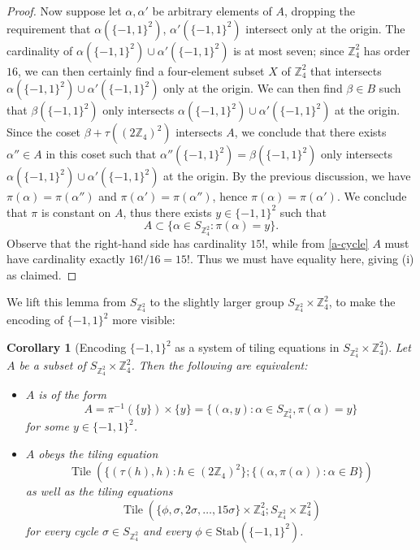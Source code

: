 \documentclass[reqno,a4paper,12pt]{amsart}
\numberwithin{equation}{section}
\numberwithin{figure}{section}
\def\Z{\mathbb{Z}}
\newcommand{\Tile}{\operatorname{Tile}}
\theoremstyle{plain}
\newtheorem{corollary}[thm]{Corollary}
\theoremstyle{definition}
\begin{document}
\begin{proof}
Now suppose let $\alpha,\alpha'$ be arbitrary elements of $A$, dropping the requirement that $\alpha(\{-1,1\}^2)$, $\alpha'(\{-1,1\}^2)$ intersect only at the origin.  The cardinality of $\alpha(\{-1,1\}^2) \cup \alpha'(\{-1,1\}^2)$ is at most seven; since $\Z_4^2$ has order $16$, we can then certainly find a four-element subset $X$ of $\Z_4^2$ that intersects $\alpha(\{-1,1\}^2) \cup \alpha'(\{-1,1\}^2)$ only at the origin.  We can then find $\beta \in B$ such that $\beta(\{-1,1\}^2)$ only intersects $\alpha(\{-1,1\}^2) \cup \alpha'(\{-1,1\}^2)$ at the origin.  Since the coset $\beta + \tau((2\Z_4)^2)$ intersects $A$, we conclude that there exists $\alpha'' \in A$ in this coset such that $\alpha''(\{-1,1\}^2) = \beta(\{-1,1\}^2)$ only intersects $\alpha(\{-1,1\}^2) \cup \alpha'(\{-1,1\}^2)$ at the origin.  By the previous discussion, we have $\pi(\alpha) = \pi(\alpha'')$ and $\pi(\alpha') = \pi(\alpha'')$, hence $\pi(\alpha) = \pi(\alpha')$.  We conclude that $\pi$ is constant on $A$, thus there exists $y \in \{-1,1\}^2$ such that 
$$ A \subset \{ \alpha \in S_{\Z_4^2}: \pi(\alpha) = y \}.$$
Observe that the right-hand side has cardinality $15!$, while from \eqref{a-cycle} $A$ must have cardinality exactly $16!/16 = 15!$.  Thus we must have equality here, giving (i) as claimed.
\end{proof}

We lift this lemma from $S_{\Z_4^2}$ to the slightly larger group $S_{\Z_4^2} \times \Z_4^2$, to make the encoding of $\{-1,1\}^2$ more visible:

\begin{corollary}[Encoding $\{-1,1\}^2$ as a system of tiling equations in $S_{\Z_4^2} \times \Z_4^2$]\label{tiling-system-2}  Let $A$ be a subset of $S_{\Z_4^2} \times \Z_4^2$.  Then the following are equivalent:
\begin{itemize}
\item[(i)] $A$ is of the form
\begin{equation}\label{aok-2}
A = \pi^{-1}(\{y\}) \times \{y\} = \{ (\alpha,y): \alpha \in S_{\Z_4^2}, \pi(\alpha) = y \} 
\end{equation}
for some $y \in \{-1,1\}^2$.
\item[(ii)]  $A$ obeys the tiling equation
\begin{equation}\label{a-tau-2}
\Tile( \{ (\tau(h), h): h \in (2\Z_4)^2 \} ; \{ (\alpha,\pi(\alpha)): \alpha \in B \} )
\end{equation}
as well as the tiling equations
\begin{equation}\label{a-cycle-2}
\Tile( \{ \phi, \sigma, 2\sigma, \dots, 15 \sigma\} \times \Z_4^2  ; S_{\Z_4^2} \times \Z_4^2 )
\end{equation}
for every cycle $\sigma \in S_{\Z_4^2}$ and every $\phi \in \mathrm{Stab}(\{-1,1\}^2)$.
\end{itemize}
\end{corollary}
\end{document}
